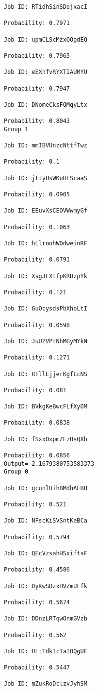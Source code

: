 \documentclass[11pt]{article}
\begin{document}
\begin{Verbatim}[commandchars=\\\{\}]
Job ID: RTidhSinSDojxacI

Probability: 0.7971

Job ID: upmCLScMzxOOgdEQ

Probability: 0.7965

Job ID: eEXnfvRYXTIAUMYU

Probability: 0.7947

Job ID: DNomeCksFQMqyLtx

Probability: 0.8043
Group 1

Job ID: mmIBVUnzcNttfTwz

Probability: 0.1

Job ID: jtJyUsWKuHLSraaS

Probability: 0.0905

Job ID: EEuvXsCEOVWwmyGf

Probability: 0.1063

Job ID: hLlroohWOdweinRF

Probability: 0.0791

Job ID: XsgJFXtfpKRDzpYk

Probability: 0.121

Job ID: GuOcysdsPbXhoLtI

Probability: 0.0598

Job ID: JuUZVPtNhMGyMYkN

Probability: 0.1271

Job ID: RTllEjjerKgfLcNS

Probability: 0.081

Job ID: BVkgKeBwcFLfXyOM

Probability: 0.0838

Job ID: fSxxOxpmZEzUsQXh

Probability: 0.0856
Output=-2.1679380753583373
Group 0

Job ID: gcunlUihBMdhALBU

Probability: 0.521

Job ID: NFscKiSVSntKeBCa

Probability: 0.5794

Job ID: QEcVzsahHSxiftsF

Probability: 0.4586

Job ID: DyKwSDzxHVZmUFfk

Probability: 0.5674

Job ID: DDnzLRTqwOnmGVzb

Probability: 0.562

Job ID: ULtTdkIcTaIOQgUF

Probability: 0.5447

Job ID: mZukRoDclzvJyhSM


\end{Verbatim}
\end{document}
